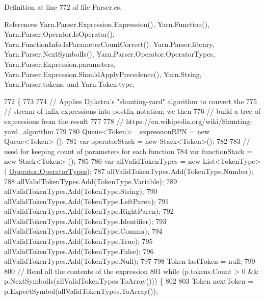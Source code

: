 Definition at line 772 of file Parser.\-cs.



References Yarn.\-Parser.\-Expression.\-Expression(), Yarn.\-Function(), Yarn.\-Parser.\-Operator.\-Is\-Operator(), Yarn.\-Function\-Info.\-Is\-Parameter\-Count\-Correct(), Yarn.\-Parser.\-library, Yarn.\-Parser.\-Next\-Symbol\-Is(), Yarn.\-Parser.\-Operator.\-Operator\-Types, Yarn.\-Parser.\-Expression.\-parameters, Yarn.\-Parser.\-Expression.\-Should\-Apply\-Precedence(), Yarn.\-String, Yarn.\-Parser.\-tokens, and Yarn.\-Token.\-type.


\begin{DoxyCode}
772                                                                          \{
773 
774                 \textcolor{comment}{// Applies Djikstra's "shunting-yard" algorithm to convert the}
775                 \textcolor{comment}{// stream of infix expressions into postfix notation; we then}
776                 \textcolor{comment}{// build a tree of expressions from the result}
777 
778                 \textcolor{comment}{// https://en.wikipedia.org/wiki/Shunting-yard\_algorithm}
779 
780                 Queue<Token> \_expressionRPN = \textcolor{keyword}{new} Queue<Token> ();
781                 var operatorStack = \textcolor{keyword}{new} Stack<Token>();
782 
783                 \textcolor{comment}{// used for keeping count of parameters for each function}
784                 var functionStack = \textcolor{keyword}{new} Stack<Token> ();
785 
786                 var allValidTokenTypes = \textcolor{keyword}{new} List<TokenType>(
      \hyperlink{a00133_ad8a4bb1b46dbc3d1b7708e78a2d97e1c}{Operator.OperatorTypes});
787                 allValidTokenTypes.Add(TokenType.Number);
788                 allValidTokenTypes.Add(TokenType.Variable);
789                 allValidTokenTypes.Add(TokenType.String);
790                 allValidTokenTypes.Add(TokenType.LeftParen);
791                 allValidTokenTypes.Add(TokenType.RightParen);
792                 allValidTokenTypes.Add(TokenType.Identifier);
793                 allValidTokenTypes.Add(TokenType.Comma);
794                 allValidTokenTypes.Add(TokenType.True);
795                 allValidTokenTypes.Add(TokenType.False);
796                 allValidTokenTypes.Add(TokenType.Null);
797 
798                 Token lastToken = null;
799 
800                 \textcolor{comment}{// Read all the contents of the expression}
801                 \textcolor{keywordflow}{while} (p.tokens.Count > 0 && p.NextSymbolIs(allValidTokenTypes.ToArray())) \{
802 
803                     Token nextToken = p.ExpectSymbol(allValidTokenTypes.ToArray());

\end{DoxyCode}
